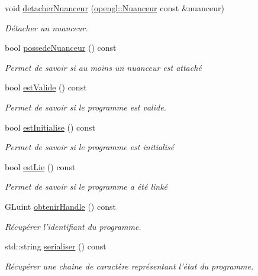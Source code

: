 \begin{DoxyCompactItemize}
void \hyperlink{classopengl_1_1_programme_a7d669afa49539b140eb440f80be3769a}{detacher\-Nuanceur} (\hyperlink{classopengl_1_1_nuanceur}{opengl\-::\-Nuanceur} const \&nuanceur)
\begin{DoxyCompactList}\small\item\em Détacher un nuanceur. \end{DoxyCompactList}\item 
bool \hyperlink{classopengl_1_1_programme_a15b37f43e795441a8ce4d9f035677677}{possede\-Nuanceur} () const 
\begin{DoxyCompactList}\small\item\em Permet de savoir si au moins un nuanceur est attaché \end{DoxyCompactList}\item 
bool \hyperlink{classopengl_1_1_programme_ae9485ed8c8a0e651a1d020f88bca0418}{est\-Valide} () const 
\begin{DoxyCompactList}\small\item\em Permet de savoir si le programme est valide. \end{DoxyCompactList}\item 
bool \hyperlink{classopengl_1_1_programme_aeba7bf4c54047bc60f334c9fd78368ff}{est\-Initialise} () const 
\begin{DoxyCompactList}\small\item\em Permet de savoir si le programme est initialisé \end{DoxyCompactList}\item 
bool \hyperlink{classopengl_1_1_programme_a8cd0cd3ad4bf0608d5a7fddd505ac488}{est\-Lie} () const 
\begin{DoxyCompactList}\small\item\em Permet de savoir si le programme a été linké \end{DoxyCompactList}\item 
G\-Luint \hyperlink{classopengl_1_1_programme_a871dc46d4531af9787b68edebb24ea37}{obtenir\-Handle} () const 
\begin{DoxyCompactList}\small\item\em Récupérer l'identifiant du programme. \end{DoxyCompactList}\item 
std\-::string \hyperlink{classopengl_1_1_programme_a7543f836defd652c0abd14aa8ce67c5b}{serialiser} () const 
\begin{DoxyCompactList}\small\item\em Récupérer une chaine de caractère représentant l'état du programme. \end{DoxyCompactList}\item 

\end{DoxyCompactItemize}
